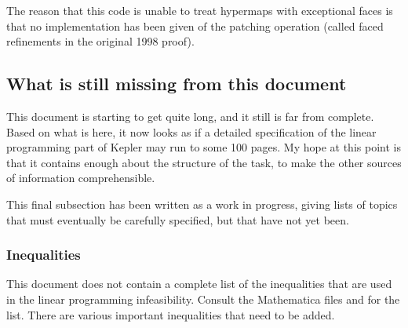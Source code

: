 The reason that this code is unable to treat hypermaps with
exceptional faces is that no implementation has been given of the
patching operation (called faced refinements in the original 1998
proof).


\subsection {What is still missing from this document}

This document is starting to get quite long, and it still is far
from complete.  Based on what is here, it now looks as if a
detailed specification of the linear programming part of Kepler
may run to some 100 pages. My hope at this point is that it
contains enough about the structure of the task, to make the other
sources of information comprehensible.

This final subsection has been written as a work in progress,
giving lists of topics that must eventually be carefully
specified, but that have not yet been.

\subsubsection{Inequalities}

This document does not contain a complete list of the inequalities
that are used in the linear programming infeasibility.  Consult
the Mathematica files and \cite{DCG} for the list.  There are
various important inequalities that need to be added.

